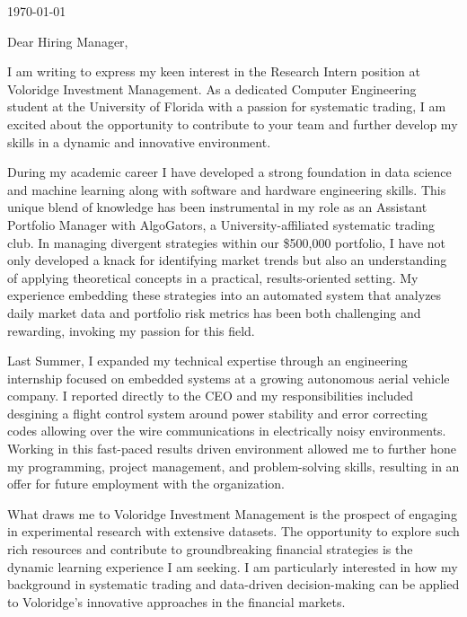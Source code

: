 \documentclass{ExpressiveCoverLetter}
\begin{document}
\sloppy

\coverletterheader[
    firstname=Cole,
    middleinitial=H,
    lastname=Rottenberg,
    email=cole.rottenberg@gmail.com,
    phone=407-961-0600,
    linkedin=cole-rottenberg,
    github=colerottenberg,
    city=Orlando,
    state=Florida,
]

\today

Dear Hiring Manager,

I am writing to express my keen interest in the Research Intern position
at Voloridge Investment Management.
As a dedicated Computer Engineering student at the University of Florida
with a passion for systematic trading, I am excited about the
opportunity to contribute to your team and further develop my skills in
a dynamic and innovative environment.

During my academic career I have developed a strong foundation in data
science and machine learning along with software and hardware
engineering skills. This unique blend of knowledge has been instrumental
in my role as an Assistant Portfolio Manager with AlgoGators, a
University-affiliated systematic trading club. In managing divergent
strategies within our \$500,000 portfolio, I have not only developed a
knack for identifying market trends but also an understanding of
applying theoretical concepts in a practical, results-oriented setting.
My experience embedding these strategies into an automated system that
analyzes daily market data and portfolio risk metrics has been both challenging and
rewarding, invoking my passion for this field.

Last Summer, I expanded my technical expertise through an engineering
internship focused on embedded systems at a growing autonomous aerial
vehicle company. I reported directly to the CEO and my responsibilities
included desgining a flight control system around power stability and
error correcting codes allowing over the wire communications in
electrically noisy environments. Working in this fast-paced results
driven environment allowed me to further hone my programming, project
management, and problem-solving skills, resulting in an offer for future
employment with the organization.

What draws me to Voloridge Investment Management is the prospect of
engaging in experimental research with extensive datasets. The
opportunity to explore such rich resources and contribute to
groundbreaking financial strategies is the dynamic learning experience I
am seeking. I am particularly interested in how my background in
systematic trading and data-driven decision-making can be applied to
Voloridge’s innovative approaches in the financial markets.
\end{document}
